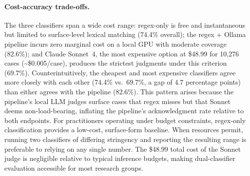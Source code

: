 \paragraph{Cost-accuracy trade-offs.} The three classifiers span a wide cost range: regex-only is free and instantaneous but limited to surface-level lexical matching (74.4\% overall); the regex + Ollama pipeline incurs zero marginal cost on a local GPU with moderate coverage (82.6\%); and Claude Sonnet~4, the most expensive option at \$48.99 for 10,276 cases (\textasciitilde\$0.005/case), produces the strictest judgments under this criterion (69.7\%). Counterintuitively, the cheapest and most expensive classifiers agree more closely with each other (74.4\% vs.\ 69.7\%, a gap of 4.7 percentage points) than either agrees with the pipeline (82.6\%). This pattern arises because the pipeline's local LLM judges surface cases that regex misses but that Sonnet deems non-load-bearing, inflating the pipeline's acknowledgment rate relative to both endpoints. For practitioners operating under budget constraints, regex-only classification provides a low-cost, surface-form baseline. When resources permit, running two classifiers of differing stringency and reporting the resulting range is preferable to relying on any single number. The \$48.99 total cost of the Sonnet judge is negligible relative to typical inference budgets, making dual-classifier evaluation accessible for most research groups.

